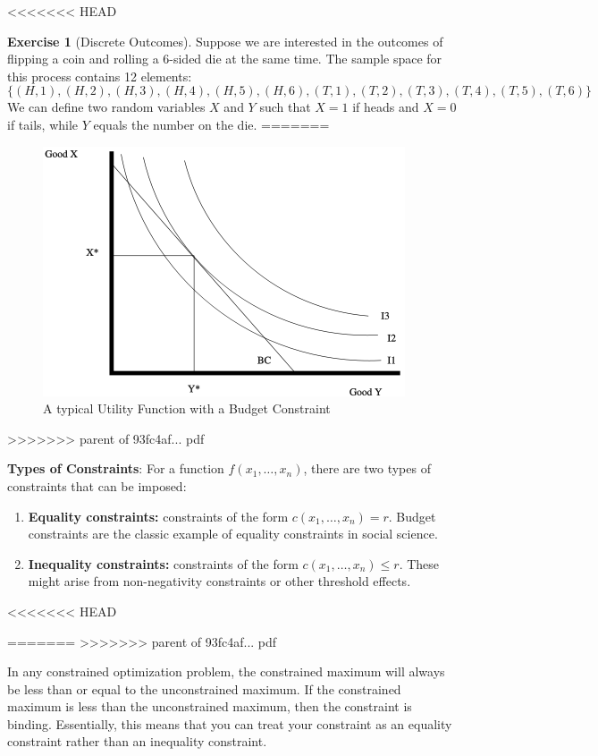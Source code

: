 \documentclass[]{book}
\theoremstyle{definition}
\theoremstyle{definition}
\theoremstyle{definition}
\newtheorem{exercise}{Exercise}[chapter]
\theoremstyle{remark}
\begin{document}
<<<<<<< HEAD
\begin{exercise}[Discrete Outcomes]
\protect\hypertarget{exr:unnamed-chunk-82}{}{\label{exr:unnamed-chunk-82} {} }Suppose we are interested in the outcomes of flipping a coin and rolling a 6-sided die at the same time. The sample space for this process contains 12 elements: \[\{(H, 1), (H, 2), (H, 3), (H, 4), (H, 5), (H, 6), (T, 1), (T, 2), (T, 3), (T, 4), (T, 5), (T, 6)\}\] We can define two random variables \(X\) and \(Y\) such that \(X = 1\) if heads and \(X = 0\) if tails, while \(Y\) equals the number on the die.
=======
\begin{figure}
\centering
\includegraphics{images/constraint.png}
\caption{A typical Utility Function with a Budget Constraint}
\end{figure}
>>>>>>> parent of 93fc4af... pdf

\textbf{Types of Constraints}: For a function \(f(x_1, \dots, x_n)\), there are two types of constraints that can be imposed:

\begin{enumerate}
\item \textbf{Equality constraints:} constraints of the form $c(x_1,\dots, x_n) = r$.
Budget constraints are the classic example of equality constraints in social science.
\item \textbf{Inequality constraints:} constraints of the form $c(x_1, \dots, x_n) \leq r$.  These might arise from non-negativity constraints or other threshold effects.
\end{enumerate}
<<<<<<< HEAD
\end{exercise}
=======
>>>>>>> parent of 93fc4af... pdf

In any constrained optimization problem, the constrained maximum will always be less than or equal to the unconstrained maximum. If the constrained maximum is less than the unconstrained maximum, then the constraint is binding. Essentially, this means that you can treat your constraint as an equality constraint rather than an inequality constraint.
\end{document}
